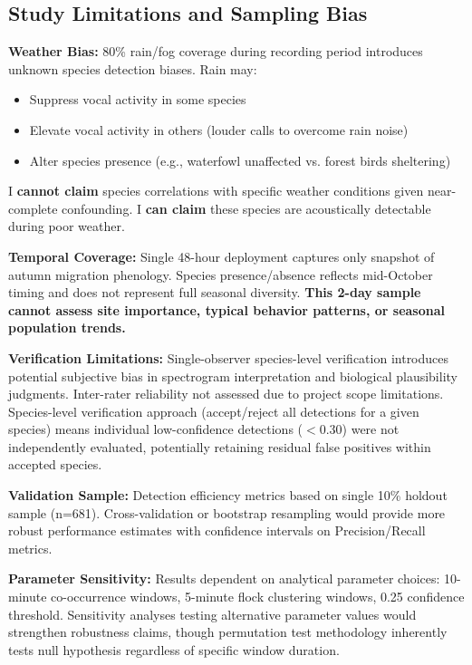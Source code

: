 \documentclass[twocolumn]{article}
\begin{document}
\subsection{Study Limitations and Sampling Bias}

\textbf{Weather Bias:} 80\% rain/fog coverage during recording period introduces unknown species detection biases. Rain may:
\begin{itemize}
\item Suppress vocal activity in some species
\item Elevate vocal activity in others (louder calls to overcome rain noise)
\item Alter species presence (e.g., waterfowl unaffected vs. forest birds sheltering)
\end{itemize}

I \textbf{cannot claim} species correlations with specific weather conditions given near-complete confounding. I \textbf{can claim} these species are acoustically detectable during poor weather.

\textbf{Temporal Coverage:} Single 48-hour deployment captures only snapshot of autumn migration phenology. Species presence/absence reflects mid-October timing and does not represent full seasonal diversity. \textbf{This 2-day sample cannot assess site importance, typical behavior patterns, or seasonal population trends.}

\textbf{Verification Limitations:} Single-observer species-level verification introduces potential subjective bias in spectrogram interpretation and biological plausibility judgments. Inter-rater reliability not assessed due to project scope limitations. Species-level verification approach (accept/reject all detections for a given species) means individual low-confidence detections ($<$0.30) were not independently evaluated, potentially retaining residual false positives within accepted species.

\textbf{Validation Sample:} Detection efficiency metrics based on single 10\% holdout sample (n=681). Cross-validation or bootstrap resampling would provide more robust performance estimates with confidence intervals on Precision/Recall metrics.

\textbf{Parameter Sensitivity:} Results dependent on analytical parameter choices: 10-minute co-occurrence windows, 5-minute flock clustering windows, 0.25 confidence threshold. Sensitivity analyses testing alternative parameter values would strengthen robustness claims, though permutation test methodology inherently tests null hypothesis regardless of specific window duration.
\end{document}
